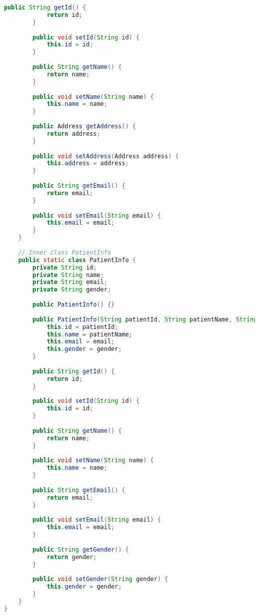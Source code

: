 \begin{lstlisting}[language=java]
		public String getId() {
			return id;
		}
		
		public void setId(String id) {
			this.id = id;
		}
		
		public String getName() {
			return name;
		}
		
		public void setName(String name) {
			this.name = name;
		}
		
		public Address getAddress() {
			return address;
		}
		
		public void setAddress(Address address) {
			this.address = address;
		}
		
		public String getEmail() {
			return email;
		}
		
		public void setEmail(String email) {
			this.email = email;
		}
	}
	
	// Inner class PatientInfo
	public static class PatientInfo {
		private String id;
		private String name;
		private String email;
		private String gender;
		
		public PatientInfo() {}
		
		public PatientInfo(String patientId, String patientName, String email, String gender) {
			this.id = patientId;
			this.name = patientName;
			this.email = email;
			this.gender = gender;
		}
		
		public String getId() {
			return id;
		}
		
		public void setId(String id) {
			this.id = id;
		}
		
		public String getName() {
			return name;
		}
		
		public void setName(String name) {
			this.name = name;
		}
		
		public String getEmail() {
			return email;
		}
		
		public void setEmail(String email) {
			this.email = email;
		}
		
		public String getGender() {
			return gender;
		}
		
		public void setGender(String gender) {
			this.gender = gender;
		}
	}
}
\end{lstlisting}

